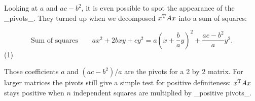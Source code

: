 Looking at \(a\) and \(ac-b^{2}\), it is even possible to spot the appearance of the _pivots_. They turned up when we decomposed \(x^{\rm T}Ax\) into a sum of squares:

\[\text{{Sum of squares}}\qquad ax^{2}+2bxy+cy^{2}=a\left(x+\frac{b}{a}y\right)^ {2}+\frac{ac-b^{2}}{a}y^{2}.\] (1)

Those coefficients \(a\) and \((ac-b^{2})/a\) are the pivots for a 2 by 2 matrix. For larger matrices the pivots still give a simple test for positive definiteness: \(x^{\rm T}Ax\) stays positive when \(n\) independent squares are multiplied by _positive pivots_.


